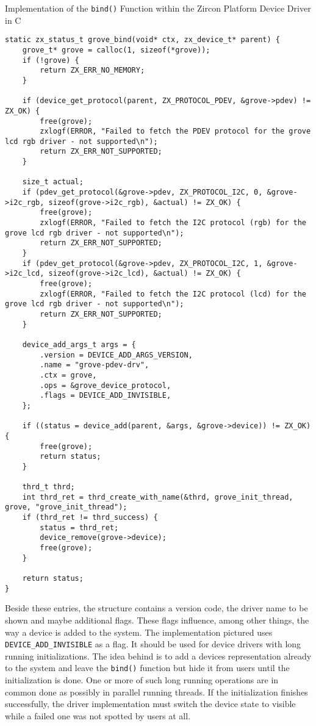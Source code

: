 \begin{listing} [H]
    \caption{Implementation of the \texttt{bind()} Function within the Zircon Platform Device Driver in C}
\label{lst:bindfunc}
\begin{verbatim}
static zx_status_t grove_bind(void* ctx, zx_device_t* parent) {
    grove_t* grove = calloc(1, sizeof(*grove));
    if (!grove) {
        return ZX_ERR_NO_MEMORY;
    }

    if (device_get_protocol(parent, ZX_PROTOCOL_PDEV, &grove->pdev) != ZX_OK) {
        free(grove);
        zxlogf(ERROR, "Failed to fetch the PDEV protocol for the grove lcd rgb driver - not supported\n");
        return ZX_ERR_NOT_SUPPORTED;
    }

    size_t actual;
    if (pdev_get_protocol(&grove->pdev, ZX_PROTOCOL_I2C, 0, &grove->i2c_rgb, sizeof(grove->i2c_rgb), &actual) != ZX_OK) {
        free(grove);
        zxlogf(ERROR, "Failed to fetch the I2C protocol (rgb) for the grove lcd rgb driver - not supported\n");
        return ZX_ERR_NOT_SUPPORTED;
    }
    if (pdev_get_protocol(&grove->pdev, ZX_PROTOCOL_I2C, 1, &grove->i2c_lcd, sizeof(grove->i2c_lcd), &actual) != ZX_OK) {
        free(grove);
        zxlogf(ERROR, "Failed to fetch the I2C protocol (lcd) for the grove lcd rgb driver - not supported\n");
        return ZX_ERR_NOT_SUPPORTED;
    }

    device_add_args_t args = {
        .version = DEVICE_ADD_ARGS_VERSION,
        .name = "grove-pdev-drv",
        .ctx = grove,
        .ops = &grove_device_protocol,
        .flags = DEVICE_ADD_INVISIBLE,
    };

    if ((status = device_add(parent, &args, &grove->device)) != ZX_OK) {
        free(grove);
        return status;
    }

    thrd_t thrd;
    int thrd_ret = thrd_create_with_name(&thrd, grove_init_thread, grove, "grove_init_thread");
    if (thrd_ret != thrd_success) {
        status = thrd_ret;
        device_remove(grove->device);
        free(grove);
    }

    return status;
}
\end{verbatim}
\end{listing}

Beside these entries, the structure contains a version code, the driver name to be shown and maybe additional flags.
These flags influence, among other things, the way a device is added to the system.
The implementation pictured uses \texttt{DEVICE_ADD_INVISIBLE} as a flag.
It should be used for device drivers with long running initializations.
The idea behind is to add a devices representation already to the system and leave the \texttt{bind()} function but hide it from users until the initialization is done.
One or more of such long running operations are in common done as possibly in parallel running threads.
If the initialization finishes successfully, the driver implementation must switch the device state to visible while a failed one was not spotted by users at all.

